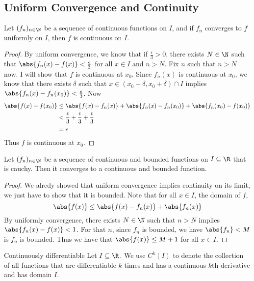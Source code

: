 \subsection{Uniform Convergence and Continuity}
\begin{thm}{}{} Let $(f_n)_{n\in\N}$ be a sequence of continuous functions on $I$, and if $f_n$ converges to $f$ uniformly on $I$, then $f$ is continuous on $I$. \tcbline
\begin{proof} By uniform convergence, we know that if $\frac{\epsilon}{3}>0$, there exists $N\in\N$ such that $\abs{f_n(x)-f(x)}<\frac{\epsilon}{3}$ for all $x\in I$ and $n>N$. Fix $n$ such that $n>N$ now. I will show that $f$ is continuous at $x_0$. Since $f_n(x)$ is continuous at $x_0$, we know that there exists $\delta$ such that $x\in(x_0-\delta,x_0+\delta)\cap I$ implies $\abs{f_n(x)-f_n(x_0)}<\frac{\epsilon}{3}$. Now
\begin{align*}
\abs{f(x)-f(x_0)}&\leq\abs{f(x)-f_n(x)}+\abs{f_n(x)-f_n(x_0)}+\abs{f_n(x_0)-f(x_0)}\\
&<\frac{\epsilon}{3}+\frac{\epsilon}{3}+\frac{\epsilon}{3}\\
&=\epsilon
\end{align*}
Thus $f$ is continuous at $x_0$. 
\end{proof}
\end{thm}

\begin{prp}{}{} Let $(f_n)_{n\in\N}$ be a sequence of continuous and bounded functions on $I\subseteq\R$ that is cauchy. Then it converges to a continuous and bounded function. \tcbline
\begin{proof} We alredy showed that uniform convergence implies continuity on its limit, we just have to show that it is bounded. Note that for all $x\in I$, the domain of $f$, $$\abs{f(x)}\leq\abs{f(x)-f_n(x)}+\abs{f_n(x)}$$ By uniformly convergence, there exists $N\in\N$ such that $n>N$ implies $\abs{f_n(x)-f(x)}<1$. For that $n$, since $f_n$ is bounded, we have $\abs{f_n}<M$ is $f_n$ is bounded. Thus we have that $\abs{f(x)}\leq M+1$ for all $x\in I$. 
\end{proof}
\end{prp}

\begin{defn}{Continuously differentiable}{} Let $I\subseteq\R$. We use $C^k(I)$ to denote the collection of all functions that are differentiable $k$ times and has a continuous $k$th derivative and has domain $I$. 
\end{defn}

